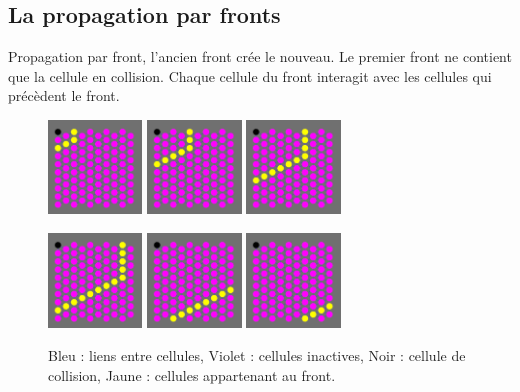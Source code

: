 \documentclass{beamer}
\begin{document}
\subsection{La propagation par fronts}
\begin{frame}
  Propagation par front, l’ancien front crée le nouveau. Le premier front ne contient que la cellule en collision.
  Chaque cellule du front interagit avec les cellules qui précèdent le front.
  \begin{figure}
    \begin{center}
      \includegraphics[width=2.5cm]{Images/front_1.png}
      \includegraphics[width=2.5cm]{Images/front_2.png}
      \includegraphics[width=2.5cm]{Images/front_3.png}
    \end{center}
    \begin{center}
      \includegraphics[width=2.5cm]{Images/front_4.png}
      \includegraphics[width=2.5cm]{Images/front_5.png}
      \includegraphics[width=2.5cm]{Images/front_6.png}
    \end{center}

    \caption{Bleu : liens entre cellules, Violet : cellules inactives, Noir : cellule de collision, Jaune : cellules appartenant au front.}
  \end{figure}
\end{frame}
\end{document}
